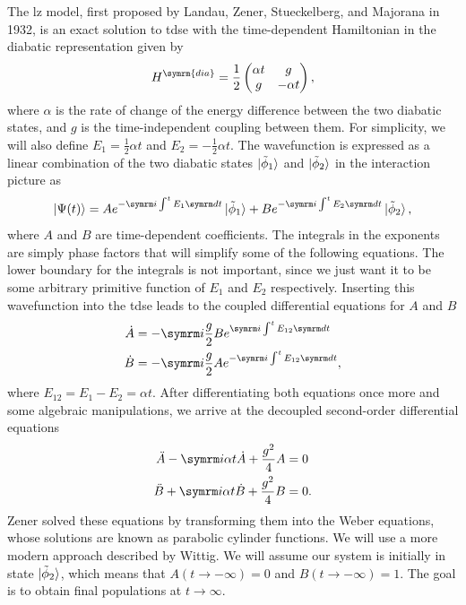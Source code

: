 The \gls{lz} model, first proposed by Landau, Zener, Stueckelberg, and Majorana in 1932,\supercite{10.1016/B978-0-08-010586-4.50014-6,10.1098/rspa.1932.0165,10.5169/seals-110177,10.1007/BF02960953} is an exact solution to \gls{tdse} with the time-dependent Hamiltonian in the diabatic representation given by
\begin{equation}\label{eq:landau_zener_hamiltonian}
H^{\symrm{dia}}=\frac{1}{2}\begin{pmatrix}
\alpha t&g\\
g&-\alpha t
\end{pmatrix},
\end{equation}
where $\alpha$ is the rate of change of the energy difference between the two diabatic states, and $g$ is the time-independent coupling between them. For simplicity, we will also define $E_1=\frac{1}{2}\alpha t$ and $E_2=-\frac{1}{2}\alpha t$. The wavefunction is expressed as a linear combination of the two diabatic states $\ket{\tilde{\phi}_1}$ and $\ket{\tilde{\phi}_2}$ in the interaction picture as
\begin{equation}
\ket{\Psi(t)}=Ae^{-\i\int^tE_1\dt}\ket{\tilde{\phi}_1}+Be^{-\i\int^tE_2\dt}\ket{\tilde{\phi}_2},
\end{equation}
where $A$ and $B$ are time-dependent coefficients. The integrals in the exponents are simply phase factors that will simplify some of the following equations. The lower boundary for the integrals is not important, since we just want it to be some arbitrary primitive function of $E_1$ and $E_2$ respectively. Inserting this wavefunction into the \gls{tdse} leads to the coupled differential equations for $A$ and $B$
\begin{align}
\dot A&=-\i\frac{g}{2}Be^{\i\int^tE_{12}\dt}\\
\dot B&=-\i\frac{g}{2}Ae^{-\i\int^tE_{12}\dt},
\end{align}
where $E_{12}=E_1-E_2=\alpha t$. After differentiating both equations once more and some algebraic manipulations, we arrive at the decoupled second-order differential equations
\begin{align}
\ddot A-\i\alpha t\dot A+\frac{g^2}{4}A&=0\\
\ddot B+\i\alpha t\dot B+\frac{g^2}{4}B&=0.\label{eq:landau_zener_uncoupled_b}
\end{align}
Zener solved these equations by transforming them into the Weber equations, whose solutions are known as parabolic cylinder functions.\supercite{10.1017/9781009004091} We will use a more modern approach described by Wittig.\supercite{10.1021/jp040627u} We will assume our system is initially in state $\ket{\tilde{\phi}_2}$, which means that $A(t\to-\infty)=0$ and $B(t\to-\infty)=1$. The goal is to obtain final populations at $t\to\infty$.

